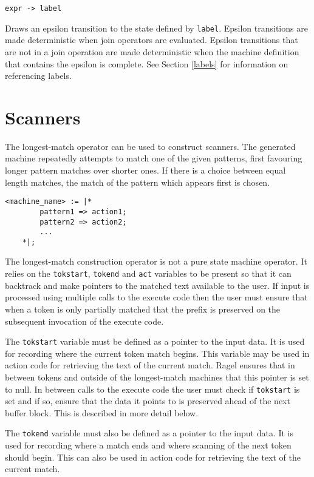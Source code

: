 \documentclass[letterpaper,11pt,oneside]{book}
\newcommand{\verbspace}{\vspace{10pt}}
\begin{document}
\verb|expr -> label| 
\verbspace

Draws an epsilon transition to the state defined
by \verb|label|.  Epsilon transitions are made deterministic when join
operators are evaluated. Epsilon transitions that are not in a join operation
are made deterministic when the machine definition that contains the epsilon is
complete. See Section \ref{labels} for information on referencing labels.


\section{Scanners}
\label{generating-scanners}

The longest-match operator can be used to construct scanners.  The generated
machine repeatedly attempts to match one of the given patterns, first favouring
longer pattern matches over shorter ones. If there is a choice between equal
length matches, the match of the pattern which appears first is chosen.

\verbspace
\begin{verbatim}
<machine_name> := |* 
        pattern1 => action1;
        pattern2 => action2;
        ...
    *|;
\end{verbatim}
\verbspace

The longest-match construction operator is not a pure state machine operator.
It relies on the \verb|tokstart|, \verb|tokend| and \verb|act| variables to be
present so that it can backtrack and make pointers to the matched text
available to the user. If input is processed using multiple calls to the
execute code then the user must ensure that when a token is only partially
matched that the prefix is preserved on the subsequent invocation of the
execute code.

The \verb|tokstart| variable must be defined as a pointer to the input data.
It is used for recording where the current token match begins. This variable
may be used in action code for retrieving the text of the current match.  Ragel
ensures that in between tokens and outside of the longest-match machines that
this pointer is set to null. In between calls to the execute code the user must
check if \verb|tokstart| is set and if so, ensure that the data it points to is
preserved ahead of the next buffer block. This is described in more detail
below.

The \verb|tokend| variable must also be defined as a pointer to the input data.
It is used for recording where a match ends and where scanning of the next
token should begin. This can also be used in action code for retrieving the
text of the current match.
\end{document}
